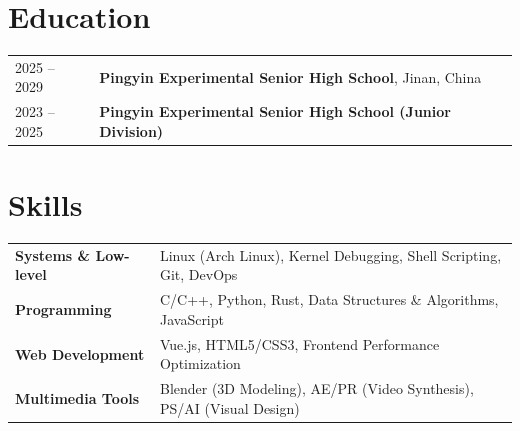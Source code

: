 \documentclass[a4paper,12pt]{article}
\begin{document}
\section{Education}

\begin{tabularx}{\linewidth}{@{}l X@{}}
2025 -- 2029 & \textbf{Pingyin Experimental Senior High School}, Jinan, China \\
2023 -- 2025 & \textbf{Pingyin Experimental Senior High School (Junior Division)} \\
\end{tabularx}

\section{Skills}

\begin{tabularx}{\linewidth}{@{}l X@{}}
\textbf{Systems \& Low-level} & \normalsize{Linux (Arch Linux), Kernel Debugging, Shell Scripting, Git, DevOps} \\
\textbf{Programming} & \normalsize{C/C++, Python, Rust, Data Structures \& Algorithms, JavaScript} \\
\textbf{Web Development} & \normalsize{Vue.js, HTML5/CSS3, Frontend Performance Optimization} \\
\textbf{Multimedia Tools} & \normalsize{Blender (3D Modeling), AE/PR (Video Synthesis), PS/AI (Visual Design)} \\
\end{tabularx}

\vfill
{}
\end{document}
